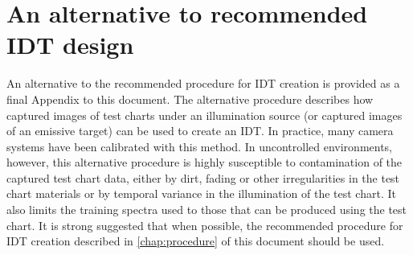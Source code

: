 \section{An alternative to recommended IDT design}
An alternative to the recommended procedure for IDT creation is provided as a final Appendix to this document. The alternative procedure describes how captured images of test charts under an illumination source (or captured images of an emissive target) can be used to create an IDT. In practice, many camera systems have been calibrated with this method. In uncontrolled environments, however, this alternative procedure is highly susceptible to contamination of the captured test chart data, either by dirt, fading or other irregularities in the test chart materials or by temporal variance in the illumination of the test chart. It also limits the training spectra used to those that can be produced using the test chart. It is strong suggested that when possible, the recommended procedure for IDT creation described in \autoref{chap:procedure} of this document should be used.